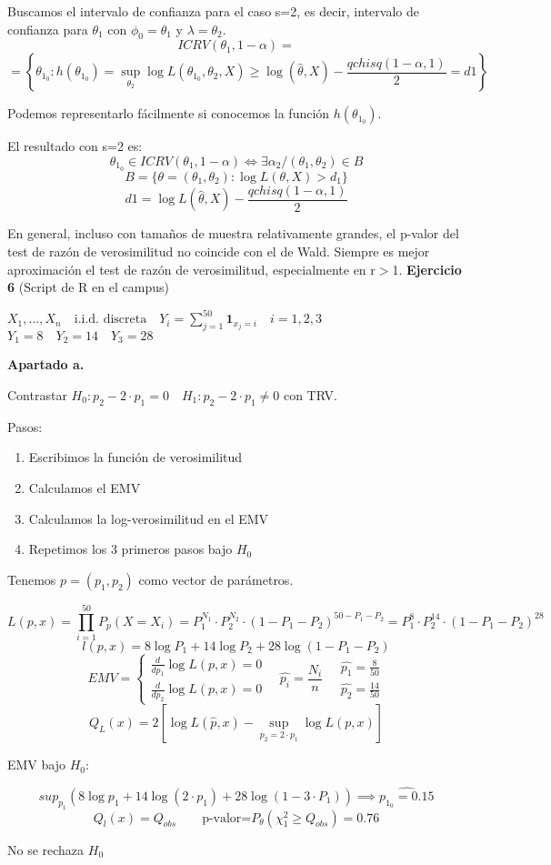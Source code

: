 Buscamos el intervalo de confianza para el caso s=2, es decir, intervalo de confianza para $\theta_1$ con $\phi_0=\theta_1$ y $\lambda=\theta_2$.
\[
ICRV(\theta_1,1-\alpha)=
\]\[
=\left\{ 
\theta_{1_0}:h(\theta_{1_0})=\sup_{\theta_2} \log L(\theta_{1_0},\theta_2,X) \geq \log(\widehat{\theta},X)-\frac{qchisq(1-\alpha,1)}{2}=d1
\right\}
\]

Podemos representarlo fácilmente si conocemos la función $h(\theta_{1_0})$.

El resultado con s=2 es:
\[
\theta_{1_0} \in  ICRV(\theta_1,1-\alpha) \Longleftrightarrow \exists \alpha_2 / (\theta_1,\theta_2) \in B
\]
\[
B=\{\theta=(\theta_1,\theta_2):\log L(\theta,X)>d_1\}
\]
\[
d1=\log L(\widehat{\theta},X)-\frac{qchisq(1-\alpha,1)}{2}
\]

En general, incluso con tamaños de muestra relativamente grandes, el p-valor del test de razón de verosimilitud no coincide con el de Wald.
Siempre es mejor aproximación el test de razón de verosimilitud, especialmente en r$>$1.
\newpage
\textbf{Ejercicio 6}
(Script de R en el campus)

\(
X_1,\dots,X_n \quad \text{i.i.d. discreta} \quad
Y_i=\sum_{j=1}^{50} \mathbf{1}_{x_j=i} \quad i=1,2,3
\)
\(
Y_1=8 \quad Y_2=14 \quad Y_3=28
\)

\textbf{Apartado a.}

Contrastar $H_0: p_2-2\cdot p_1=0 \quad H_1: p_2-2\cdot p_1 \neq 0$
con TRV.

Pasos:
\begin{enumerate}
    \item Escribimos la función de verosimilitud
    \item Calculamos el EMV
    \item Calculamos la log-verosimilitud en el EMV
    \item Repetimos los 3 primeros pasos bajo $H_0$
\end{enumerate}

Tenemos $p=(p_1,p_2)$ como vector de parámetros.

\[
L(p,x)=\prod_{i=1}^{50} P_p(X=X_i)=P_1^{N_1}\cdot P_2^{N_2}\cdot (1-P_1-P_2)^{50-P_1-P_2}=P_1^8\cdot P_2^{14} \cdot (1-P_1-P_2)^{28}
\]
\[
l(p,x)=8 \log P_1 +14 \log P_2 +28 \log (1-P_1-P_2)
\]
\[
EMV=\left\{
\begin{array}{l}
    \frac{d}{d p_1} \log L(p,x)=0\\
    \frac{d}{d p_2} \log L(p,x)=0
\end{array}
\right.
\quad \widehat{p_i}=\frac{N_i}{n}
\quad
\begin{matrix}
    \widehat{p_1}=\frac{8}{50}\\
    \widehat{p_2}=\frac{14}{50}
\end{matrix}
\]
\[
Q_L(x)=2[\log L(\widehat{p},x)-\sup_{p_2=2\cdot p_1}\log L(p,x)]
\]

EMV bajo $H_0$:

\[
sup_{p_1}(8 \log p_1 +14 \log(2\cdot p_1)+28 \log(1-3\cdot P_1))\implies \widehat{p_{1_0}=0.15}
\]
\[
Q_l(x)=Q_{obs} \qquad \text{p-valor=}P_\theta(\chi^2_1 \geq Q_{obs})=0.76
\]

No se rechaza $H_0$




